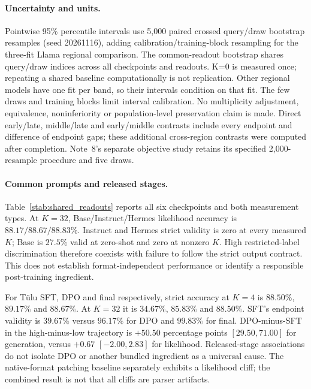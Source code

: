 \paragraph{Uncertainty and units.} Pointwise 95\% percentile intervals use 5,000 paired crossed query/draw bootstrap resamples (seed 20261116), adding calibration/training-block resampling for the three-fit Llama regional comparison. The common-readout bootstrap shares query/draw indices across all checkpoints and readouts. K=0 is measured once; repeating a shared baseline computationally is not replication. Other regional models have one fit per band, so their intervals condition on that fit. The few draws and training blocks limit interval calibration. No multiplicity adjustment, equivalence, noninferiority or population-level preservation claim is made. Direct early/late, middle/late and early/middle contrasts include every endpoint and difference of endpoint gaps; these additional cross-region contrasts were computed after completion. Note~8's separate objective study retains its specified 2,000-resample procedure and five draws.

\paragraph{Common prompts and released stages.} Table~\ref{stab:shared_readouts} reports all six checkpoints and both measurement types. At $K=32$, Base/Instruct/Hermes likelihood accuracy is $88.17/88.67/88.83\%$. Instruct and Hermes strict validity is zero at every measured $K$; Base is $27.5\%$ valid at zero-shot and zero at nonzero $K$. High restricted-label discrimination therefore coexists with failure to follow the strict output contract. This does not establish format-independent performance or identify a responsible post-training ingredient.

For T\"ulu SFT, DPO and final respectively, strict accuracy at $K=4$ is $88.50\%$, $89.17\%$ and $88.67\%$. At $K=32$ it is $34.67\%$, $85.83\%$ and $88.50\%$. SFT's endpoint validity is $39.67\%$ versus $96.17\%$ for DPO and $99.83\%$ for final. DPO-minus-SFT in the high-minus-low trajectory is $+50.50$ percentage points $[29.50,71.00]$ for generation, versus $+0.67$ $[-2.00,2.83]$ for likelihood. Released-stage associations do not isolate DPO or another bundled ingredient as a universal cause. The native-format patching baseline separately exhibits a likelihood cliff; the combined result is not that all cliffs are parser artifacts.


